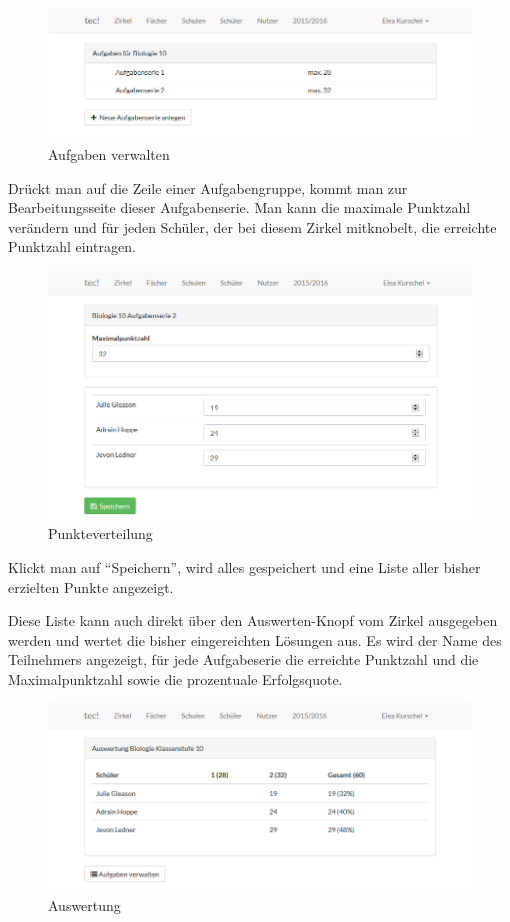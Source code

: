 \begin{figure}[h]
	\centering
	\includegraphics[scale=.5]{bilder/Aufgaben_verwalten.png}
	\caption{Aufgaben verwalten}
\end{figure}

Drückt man auf die Zeile einer Aufgabengruppe, kommt man zur Bearbeitungsseite dieser Aufgabenserie. Man kann die maximale Punktzahl verändern und für jeden Schüler, der bei diesem Zirkel mitknobelt, die erreichte Punktzahl eintragen. 

\begin{figure}[h]
	\centering
	\includegraphics[scale=.5]{bilder/Aufgabenserie.png}
	\caption{Punkteverteilung}
\end{figure}

\newpage
Klickt man auf "`Speichern"', wird alles gespeichert und eine Liste aller bisher erzielten Punkte angezeigt. 

Diese Liste kann auch direkt über den Auswerten-Knopf vom Zirkel ausgegeben werden und wertet die bisher eingereichten Lösungen aus. Es wird der Name des Teilnehmers angezeigt, für jede Aufgabeserie die erreichte Punktzahl und die Maximalpunktzahl sowie die prozentuale Erfolgsquote.

\begin{figure}[h]
	\centering
	\includegraphics[scale=.5]{bilder/Auswertung.png}
	\caption{Auswertung}
\end{figure}

